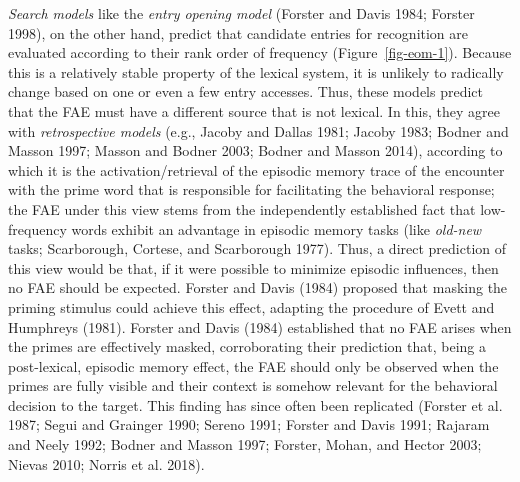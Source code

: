 \documentclass[
]{interact}
\begin{document}
\emph{Search models} like the \emph{entry opening model} (Forster and
Davis 1984; Forster 1998), on the other hand, predict that candidate
entries for recognition are evaluated according to their rank order of
frequency (Figure~\ref{fig-eom-1}). Because this is a relatively stable
property of the lexical system, it is unlikely to radically change based
on one or even a few entry accesses. Thus, these models predict that the
FAE must have a different source that is not lexical. In this, they
agree with \emph{retrospective models} (e.g., Jacoby and Dallas 1981;
Jacoby 1983; Bodner and Masson 1997; Masson and Bodner 2003; Bodner and
Masson 2014), according to which it is the activation/retrieval of the
episodic memory trace of the encounter with the prime word that is
responsible for facilitating the behavioral response; the FAE under this
view stems from the independently established fact that low-frequency
words exhibit an advantage in episodic memory tasks (like \emph{old-new}
tasks; Scarborough, Cortese, and Scarborough 1977). Thus, a direct
prediction of this view would be that, if it were possible to minimize
episodic influences, then no FAE should be expected. Forster and Davis
(1984) proposed that masking the priming stimulus could achieve this
effect, adapting the procedure of Evett and Humphreys (1981). Forster
and Davis (1984) established that no FAE arises when the primes are
effectively masked, corroborating their prediction that, being a
post-lexical, episodic memory effect, the FAE should only be observed
when the primes are fully visible and their context is somehow relevant
for the behavioral decision to the target. This finding has since often
been replicated (Forster et al. 1987; Segui and Grainger 1990; Sereno
1991; Forster and Davis 1991; Rajaram and Neely 1992; Bodner and Masson
1997; Forster, Mohan, and Hector 2003; Nievas 2010; Norris et al. 2018).
\end{document}
